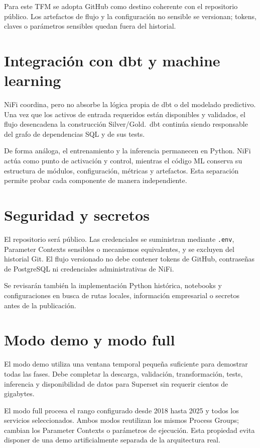 Para este TFM se adopta GitHub como destino coherente con el repositorio público. Los artefactos de flujo y la configuración no sensible se versionan; tokens, claves o parámetros sensibles quedan fuera del historial.

\section{Integración con dbt y machine learning}

NiFi coordina, pero no absorbe la lógica propia de dbt o del modelado predictivo. Una vez que los activos de entrada requeridos están disponibles y validados, el flujo desencadena la construcción Silver/Gold.\ dbt continúa siendo responsable del grafo de dependencias SQL y de sus tests.

De forma análoga, el entrenamiento y la inferencia permanecen en Python. NiFi actúa como punto de activación y control, mientras el código ML conserva su estructura de módulos, configuración, métricas y artefactos. Esta separación permite probar cada componente de manera independiente.

\section{Seguridad y secretos}

El repositorio será público. Las credenciales se suministran mediante \texttt{.env}, Parameter Contexts sensibles o mecanismos equivalentes, y se excluyen del historial Git. El flujo versionado no debe contener tokens de GitHub, contraseñas de PostgreSQL ni credenciales administrativas de NiFi.

Se revisarán también la implementación Python histórica, notebooks y configuraciones en busca de rutas locales, información empresarial o secretos antes de la publicación.

\section{Modo demo y modo full}

El modo demo utiliza una ventana temporal pequeña suficiente para demostrar todas las fases. Debe completar la descarga, validación, transformación, tests, inferencia y disponibilidad de datos para Superset sin requerir cientos de gigabytes.

El modo full procesa el rango configurado desde 2018 hasta 2025 y todos los servicios seleccionados. Ambos modos reutilizan los mismos Process Groups; cambian los Parameter Contexts o parámetros de ejecución. Esta propiedad evita disponer de una demo artificialmente separada de la arquitectura real.

